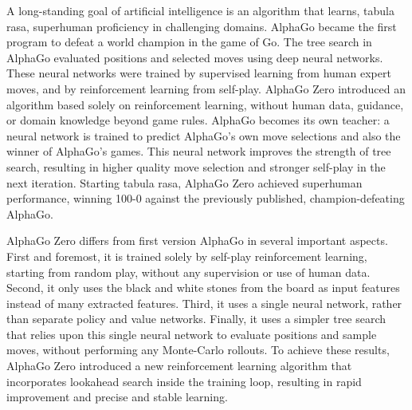 \documentclass[12pt,a4paper]{article}
\begin{document}
\hspace{0.6cm} A long-standing goal of artificial intelligence is an algorithm that learns, tabula rasa, superhuman proficiency in challenging domains. AlphaGo became the first program to defeat a world champion in the game of Go. The tree search in AlphaGo evaluated positions and selected moves using deep neural networks. These neural networks were trained by supervised learning from human expert moves, and by reinforcement learning from self-play. AlphaGo Zero introduced an algorithm based solely on reinforcement learning, without human data, guidance, or domain knowledge beyond game rules. AlphaGo becomes its own teacher: a neural network is trained to predict AlphaGo’s own move selections and also the winner of AlphaGo’s games. This neural network improves the strength of tree search, resulting in higher quality move selection and stronger self-play in the next iteration. Starting tabula rasa, AlphaGo Zero achieved superhuman performance, winning 100-0 against the previously published, champion-defeating AlphaGo.\par
\hspace{0cm}AlphaGo Zero differs from first version AlphaGo in several important aspects. First and foremost, it is trained solely by self-play reinforcement learning, starting from random play, without any supervision or use of human data. Second, it only uses the black and white stones from the board as input features instead of many extracted features. Third, it uses a single neural network, rather than separate policy and value networks. Finally, it uses a simpler tree search that relies upon this single neural network to evaluate positions and sample moves, without performing any Monte-Carlo rollouts. To achieve these results, AlphaGo Zero introduced a new reinforcement learning algorithm that incorporates lookahead search inside the training loop, resulting in rapid improvement and precise and stable learning\cite{AlphaGoZero}.\par
\end{document}
